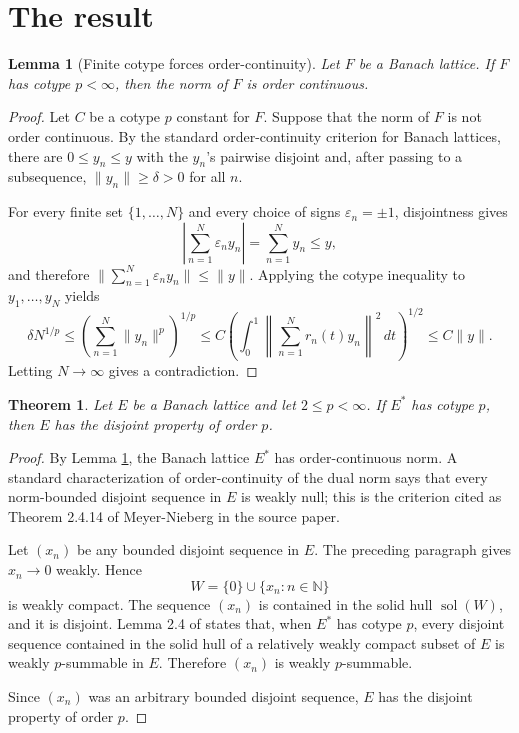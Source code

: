 \documentclass[11pt]{article}
\newtheorem{theorem}{Theorem}
\newtheorem{lemma}{Lemma}
\newcommand{\sol}{\operatorname{sol}}
\begin{document}
\section{The result}

\begin{lemma}[Finite cotype forces order-continuity]\label{lem:cotype-oc}
Let \(F\) be a Banach lattice.  If \(F\) has cotype \(p<\infty\), then the
norm of \(F\) is order continuous.
\end{lemma}

\begin{proof}
Let \(C\) be a cotype \(p\) constant for \(F\).  Suppose that the norm of
\(F\) is not order continuous.  By the standard order-continuity criterion for
Banach lattices, there are \(0\le y_n\le y\) with the \(y_n\)'s pairwise
disjoint and, after passing to a subsequence, \(\|y_n\|\ge \delta>0\) for all
\(n\).

For every finite set \(\{1,\dots,N\}\) and every choice of signs
\(\varepsilon_n=\pm1\), disjointness gives
\[
  \left|\sum_{n=1}^N \varepsilon_n y_n\right|
  =\sum_{n=1}^N y_n
  \le y,
\]
and therefore \(\|\sum_{n=1}^N \varepsilon_n y_n\|\le \|y\|\).  Applying the
cotype inequality to \(y_1,\dots,y_N\) yields
\[
  \delta N^{1/p}
  \le \left(\sum_{n=1}^N \|y_n\|^p\right)^{1/p}
  \le C\left(\int_0^1
        \left\|\sum_{n=1}^N r_n(t)y_n\right\|^2\,dt
      \right)^{1/2}
  \le C\|y\|.
\]
Letting \(N\to\infty\) gives a contradiction.
\end{proof}

\begin{theorem}\label{thm:dual-cotype-disjoint-property}
Let \(E\) be a Banach lattice and let \(2\le p<\infty\).  If \(E^*\) has
cotype \(p\), then \(E\) has the disjoint property of order \(p\).
\end{theorem}

\begin{proof}
By Lemma \ref{lem:cotype-oc}, the Banach lattice \(E^*\) has order-continuous
norm.  A standard characterization of order-continuity of the dual norm says
that every norm-bounded disjoint sequence in \(E\) is weakly null; this is the
criterion cited as Theorem 2.4.14 of Meyer-Nieberg in the source paper.

Let \((x_n)\) be any bounded disjoint sequence in \(E\).  The preceding
paragraph gives \(x_n\to0\) weakly.  Hence
\[
  W=\{0\}\cup\{x_n:n\in\mathbb N\}
\]
is weakly compact.  The sequence \((x_n)\) is contained in the solid hull
\(\sol(W)\), and it is disjoint.  Lemma 2.4 of
\cite{botelho-garcia-miranda} states that, when \(E^*\) has cotype \(p\),
every disjoint sequence contained in the solid hull of a relatively weakly
compact subset of \(E\) is weakly \(p\)-summable in \(E\).  Therefore
\((x_n)\) is weakly \(p\)-summable.

Since \((x_n)\) was an arbitrary bounded disjoint sequence, \(E\) has the
disjoint property of order \(p\).
\end{proof}
\end{document}
